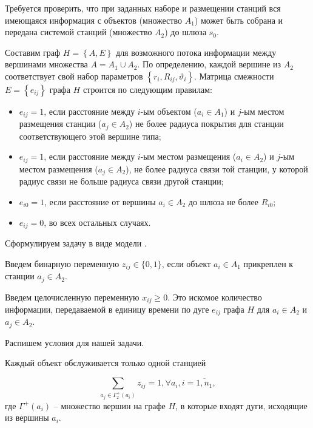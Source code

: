 Требуется проверить, что при заданных наборе и размещении станций вся имеющаяся информация с объектов (множество $A_1$) может быть собрана и передана системой станций (множество $A_2$) до шлюза $s_0$.



Составим граф $ H = \left\{A,E \right\} $ для возможного потока информации между вершинами множества $ A = A_1 \cup A_2 $. По определению, каждой вершине из $ A_2 $ соответствует свой набор параметров $\left\{ r_i,  R_{ij}, \vartheta_i \right\} $.
Матрица смежности $E = \left\{ e_{ij} \right\}$ графа $H$ строится по следующим правилам:

\begin{itemize}
    \item $e_{ij} = 1$, если расстояние между $i$-ым объектом ($a_i \in A_1$) и $j$-ым местом размещения станции ($a_j \in A_2$) не более радиуса покрытия для станции соответствующего этой вершине типа; 
    \item $e_{ij} = 1$, если расстояние между $i$-ым местом размещения ($a_i \in A_2$) и $j$-ым местом размещения  ($a_j \in A_2$), не более радиуса связи той станции, у которой радиус связи не больше радиуса связи другой станции;
    \item $e_{i0} = 1$, если расстояние от вершины $a_i \in A_2$ до шлюза не более $R_{i0}$;
    \item $e_{ij} = 0$, во всех остальных случаях.
\end{itemize}

Сформулируем задачу в виде модели .

Введем бинарную переменную $z_{ij} \in \{0, 1\}$, если объект $a_i \in A_1$ прикреплен к станции $a_j  \in A_2$.     

Введем целочисленную переменную $x_{ij} \geqslant 0$. Это искомое количество информации, передаваемой в единицу времени по дуге $e_{ij}$ графа $H$ для $a_i  \in A_2$ и $a_j  \in A_2$.


Распишем условия для нашей задачи.

Каждый объект обслуживается только одной станцией

\begin{equation}\label{eq:part2_1.1}
    \sum_{a_j \in \Gamma_2^+(a_i)} z_{ij} = 1, \forall a_i, i=\overline{1, n_1},
\end{equation}
где $\Gamma^+(a_i)$ – множество вершин на графе $H$, в которые входят дуги, исходящие из вершины $a_i$.

